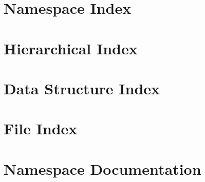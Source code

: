 \let\mypdfximage\pdfximage\def\pdfximage{\immediate\mypdfximage}\documentclass[twoside]{book}
\newcommand{\+}{\discretionary{\mbox{\scriptsize$\hookleftarrow$}}{}{}}
\begin{document}
\chapter{Namespace Index}

\chapter{Hierarchical Index}

\chapter{Data Structure Index}

\chapter{File Index}

\chapter{Namespace Documentation}
























\end{document}
